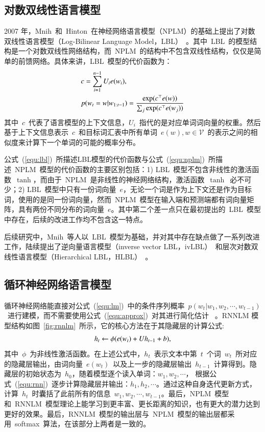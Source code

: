 \subsection{对数双线性语言模型}
2007 年，Mnih~和~Hinton~在神经网络语言模型（NPLM）的基础上提出了对数双线性语言模型（Log-Bilinear Language Model，LBL）~。其中~LBL~的模型结构是一个对数双线性网络结构，而~NPLM~的结构中不包含双线性结构，仅仅是简单的前馈网络。具体来讲，LBL~模型的代价函数为：
\begin{equation}
\setlength{\abovedisplayskip}{10pt}
\setlength{\belowdisplayskip}{10pt}
\label{equ:lbl}
\begin{split}
   &c=\sum_{i=1}^{n-1}{U_i e({w_i})}, \\
   &p(w_t=w|w_{1:t-1})=\frac{\exp(c^\top e(w))}{\sum_j{\exp(c^\top e(w_j))}}
\end{split}
\end{equation}
其中~$c$~代表了语言模型的上下文信息，$U_i$~指代的是对应单词词向量的权重。然后基于上下文信息表示~$c$~和目标词汇表中所有单词~$e(w),w\in \mathcal{V}$~的表示之间的相似度来计算下一个单词的可能的概率分布。

公式~(\ref{equ:lbl})~所描述LBL模型的代价函数与公式~(\ref{equ:nplm})~所描述~NPLM~模型的代价函数的主要区别包括：1) LBL~模型不包含非线性的激活函数~$\tanh$，而由于~NPLM~是非线性的神经网络结构，激活函数~$\tanh$~必不可少；2) LBL~模型中只有一份词向量~$e$，无论一个词是作为上下文还是作为目标词，使用的是同一份词向量，然而~NPLM~模型在输入端和预测端都有词向量矩阵，具有两份不同分布的词向量~$e$。其中第二个差一点只在最初提出的~LBL~模型中存在，后续的改进工作均不包含这一特点。

后续研究中，Mnih~等人以~LBL~模型为基础，并对其中存在缺点做了一系列改进工作，陆续提出了逆向量语言模型（inverse vector LBL，ivLBL）~和层次对数双线性语言模型（Hierarchical LBL，HLBL）~。

\subsection{循环神经网络语言模型}
循环神经网络能直接对公式~(\ref{equ:lm})~中的条件序列概率~$p(w_t| w_1,w_2,\cdots,w_{t-1})$~进行建模，而不需要使用公式~(\ref{equ:approx})~对其进行简化估计~ 。RNNLM 模型结构如图~\ref{fig:rnnlm}~所示，它的核心方法在于其隐藏层的计算公式:
\begin{equation}
\label{equ:rnn}
\setlength{\abovedisplayskip}{10pt}
\setlength{\belowdisplayskip}{10pt}
  h_t \leftarrow  \phi(e(w_t) + U h_{t-1} +b),
\end{equation}
其中~$\phi$~为非线性激活函数。在上述公式中，$h_t$~表示文本中第~$t$~个词~$w_t$~所对应的隐藏层输出，由词向量~$e(w_t)$~以及上一步的隐藏层输出~$h_{t -1}$~计算得到。隐藏层的初始状态为~$h_0$，随着模型逐个读入单词：$w_1,w_2,\cdots$， 根据公式~(\ref{equ:rnn})~逐步计算隐藏层并输出：$h_1,h_2,\cdots$。通过这种自身迭代更新方式，计算~$h_t$~时囊括了此前所有的信息~$w_1,w_2,\cdots,w_{t-1}$。最后，NPLM~模型和~RNNLM~模型理论上能学习到更丰富、更长距离的知识，也有更大的潜力达到更好的效果。最后，RNNLM~模型的输出层与~NPLM~模型的输出层都采用~softmax~算法，在该部分上两者是一致的。

